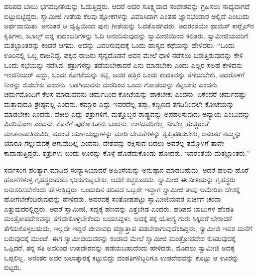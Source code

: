  ಹರಿಪದ ಬಾಬು ಭಗವದ್ಗೀತೆಯನ್ನು ಓದುತ್ತಿದ್ದರು. ಆದರೆ ಅದರ ಸೂಕ್ಷ್ಮವಾದ ಸಂದೇಶವನ್ನು ಗ್ರಹಿಸಲು ಸಾಧ್ಯವಾಗದೆ ಬಿಟ್ಟುಬಿಟ್ಟಿದ್ದರು. ಸ್ವಾಮೀಜಿ ಗೀತೆಯ ಕೆಲವು ಶ್ಲೋಕಗಳನ್ನು ವಿವರಿಸಿದಾಗ ಎಂತಹ ಜ್ಞಾನಭಂಡಾರ ಅಲ್ಲಿದೆ ಎಂಬುದು ಅರ್ಥವಾಯಿತು. ಅನಂತರ ಆ ದೃಷ್ಟಿಯಿಂದ ಪುನಃ ಗೀತೆಯನ್ನು ಓದತೊಡಗಿದರು. ಅದರಂತೆಯೇ ಥಾಮಸ್ ಕಾರ‍್ಲೈಲ್‍ನ ಕೃತಿಗಳು, ಜೂಲ್ಸ್ ‍ವರ‍್ನ ಕಾದಂಬರಿಗಳನ್ನು ಓದಿ ಆನಂದಿಸುವುದನ್ನು ಸ್ವಾಮೀಜಿಯಿಂದ ಕಲಿತರು. ಸ್ವಾಮೀಜಿಯವರಿಗೆ ಮತಭ್ರಾಂತರನ್ನು ಕಂಡರೆ ಆಗದು. ಅದನ್ನು ವಿವರಿಸುವುದಕ್ಕೆ ಒಂದು ಹಾಸ್ಯದ ಕಥೆಯನ್ನು ಹೇಳಿದರು: “ಒಂದು ಊರಿನಲ್ಲಿ ಒಬ್ಬ ರಾಜನಿದ್ದ. ಪಕ್ಕದ ರಾಜರು ಸೈನ್ಯದೊಡನೆ ಅವನ ಮೇಲೆ ಧಾಳಿ ನಡೆಸಲು ಬರುತ್ತಿರುವುದನ್ನು ಕೇಳಿ ಒಂದು ಸಭೆಯನ್ನು ನಡೆಸಿದ. ಶತ್ರುಗಳನ್ನು ತಡೆಯಬೇಕಾದರೆ ಏನು ಮಾಡಬೇಕು ಎಂದು ಎಲ್ಲರ ಸಲಹೆ ಕೇಳಿದನು ಇಂಜಿನಿಯರ್ ಎದ್ದು, ಒಂದು ಕೋಟೆಯನ್ನು ಕಟ್ಟಿ, ಅದರ ಹತ್ತಿರ ಒಂದು ಕಂದಕವನ್ನು ತೆಗೆಯಬೇಕು, ಅದರೊಳಗೆ ನೀರನ್ನು ಬಿಡಬೇಕು ಎಂದನು. ಬಡಗಿಯವನು ಮರದಿಂದ ಒಂದು ಗೋಡೆಯನ್ನು ಕಟ್ಟಬೇಕು ಎಂದನು. ಚರ್ಮದೊಂದಿಗೆ ಕೆಲಸ ಮಾಡುವವನು ಚರ್ಮದಿಂದ ಕೋಟೆಯನ್ನು ಹಾಕಬೇಕು ಎಂದನು. ಏಕೆಂದರೆ ಚರ್ಮದಷ್ಟು ಮತ್ತಾವುದೂ ಶ್ರೇಷ್ಠವಲ್ಲ ಎಂದನು. ಕಮ್ಮಾರ ಎದ್ದು ಇವರದೆಲ್ಲ ತಪ್ಪು, ಕಬ್ಬಿಣದ ತಗಡಿನಿಂದಲೇ ಕೋಟೆಯನ್ನು ಮಾಡಬೇಕು ಎಂದನು. ವಕೀಲ ಎದ್ದು ಶತ್ರುಗಳಿಗೆ, ಮತ್ತೊಬ್ಬರ ರಾಷ್ಟ್ರವನ್ನು ಅಪಹರಿಸುವುದು ಅನ್ಯಾಯ ಎಂಬುದನ್ನು ವಿವರಿಸೋಣ ಎಂದನು. ಕೊನೆಗೆ ಪುರೋಹಿತನು ಬಂದನು. ಉಳಿದವರಿಗೆಲ್ಲ, ನೀವೆಲ್ಲ ಹುಚ್ಚರಂತೆ ಮಾತನಾಡುತ್ತಿರುವಿರಿ, ಮುಂಚೆ ಯಾಗಯಜ್ಞಗಳನ್ನು ಮಾಡಿ ದೇವತೆಗಳನ್ನು ತೃಪ್ತಿಪಡಿಸಬೇಕು, ಅನಂತರ ನಮ್ಮನ್ನು ಯಾರೂ ಗೆಲ್ಲುವುದಕ್ಕೆ ಆಗುವುದಿಲ್ಲ ಎಂದನು. ದೇಶವನ್ನು ರಕ್ಷಿಸುವ ಬದಲು ಅವರೆಲ್ಲ ತಮ್ಮೊಳಗೆ ತಾವೇ ಕಾದಾಡುತ್ತಿದ್ದರು. ಶತ್ರುಗಳು ಬಂದು ಊರನ್ನು ಕೊಳ್ಳೆ ಹೊಡೆದುಕೊಂಡು ಹೋದರು. ಇದರಂತೆಯೆ ಮತಭ್ರಾಂತರು.” 

 ಸರ್ವಸಂಗ ಪರಿತ್ಯಾಗ ಮಾಡಿದ ಸಂನ್ಯಾಸಿಯಾದರೆ ಅಹಿಂಸೆಯನ್ನು ಅನುಷ್ಠಾನ ಮಾಡಬಹುದು; ಆದರೆ ಹಲವು ಹೊರೆ ಹೊಣೆಗಳುಳ್ಳ ಗೃಹಸ್ಥರಾದರೊ ಭುಸುಗುಟ್ಟಬೇಕು, ಆದರೆ ಕಚ್ಚಕೂಡದು. ಸ್ವಾಮೀಜಿ ಈ ನೀತಿಯನ್ನು ಗೃಹಸ್ಥರು ಅನುಸರಿಸಬೇಕೆಂದು ಹೇಳುತ್ತಿದ್ದರು. ಒಂದುದಿನ ಹರಿಪದ ಒಬ್ಬರೇ ಇದ್ದಾಗ ಸ್ವಾಮೀಜಿ ತಾವು ಅಮೇರಿಕಾ ದೇಶಕ್ಕೆ ಹೋಗಬೇಕೆಂದಿರುವುದನ್ನು ಹೇಳಿದರು. ಅವರದಕ್ಕೆ ಸಂತೋಷಪಟ್ಟು ಸ್ವಾಮೀಜಿಯವರ ಖರ್ಚಿಗೆ ಚಂದಾ ಎತ್ತುವುದರಲ್ಲಿದ್ದರು. ಆದರೆ ಸ್ವಾಮೀಜಿ, ಸದ್ಯಕ್ಕೆ ಹಣವನ್ನು ಎತ್ತಬೇಡ ಎಂದರು. ಹರಿಪದ ಬಾಬುಗಳ ಹೆಂಡತಿ ಮಂತ್ರೋಪದೇಶವನ್ನು ತೆಗೆದುಕೊಳ್ಳಬೇಕೆಂದು ಬಯಸಿದ್ದಳು. ಅದಕ್ಕೆ ತಕ್ಕ ಯೋಗ್ಯ ಗುರು ಸಿಕ್ಕಿದರೆ ಬೇಕಾದರೆ ತೆಗೆದುಕೊಳ್ಳಬಹುದು, ಇಲ್ಲದೇ ಇದ್ದರೆ ಜೀವಾವಧಿ ಪಶ್ಚಾತ್ತಾಪ ಪಡಬೇಕಾಗುವುದೆಂದಿದ್ದರು, ಸ್ವಾಮೀಜಿ ಇವರ ಮನೆಗೆ ಬರುವುದಕ್ಕೆ ಮುಂಚೆ. ಈಗ ಸ್ವಾಮೀಜಿಯವರನ್ನು ಕಂಡಾದ ಮೇಲೆ ಸ್ವಾಮೀಜಿ ಮಂತ್ರೋಪದೇಶ ಕೊಡುವುದಕ್ಕೆ ಒಪ್ಪಿದರೆ, ತನ್ನ ಸತಿ ಅವರಿಂದ ಉಪದೇಶವನ್ನು ಪಡೆಯಬಹುದೆಂದು ಹೇಳಿದರು. ಮೊದಲು ಸ್ವಾಮೀಜಿ ಅದಕ್ಕೆ ಒಪ್ಪಲಿಲ್ಲ. ಅನಂತರ ಅವರ ಬಲಾತ್ಕಾರಕ್ಕೆ ಕಟ್ಟುಬಿದ್ದು ದಂಪತಿಗಳಿಬ್ಬರಿಗೂ ಉಪದೇಶವನ್ನು ಕೊಟ್ಟು ಆ ಊರನ್ನು ಬಿಟ್ಟರು. 

